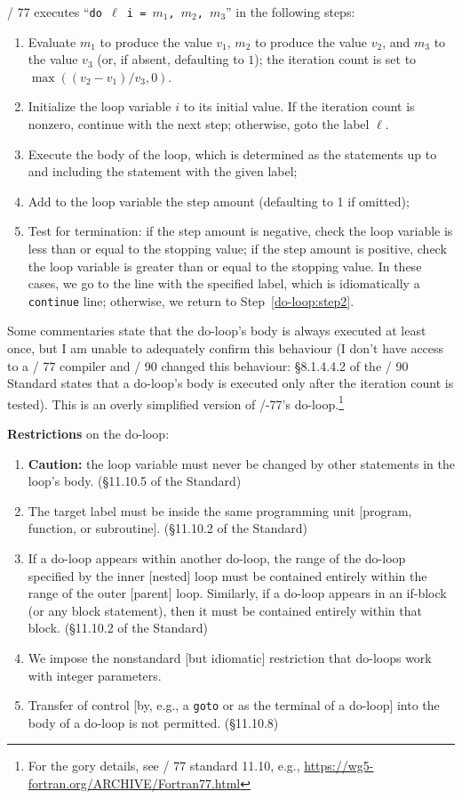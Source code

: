 \FORTRAN/ 77 executes ``\texttt{do $\ell$ i = $m_{1}$, $m_{2}$, $m_{3}$}''
in the following steps:
\begin{enumerate}
\item Evaluate $m_{1}$ to produce the value $v_{1}$, $m_{2}$ to produce
  the value $v_{2}$, and $m_{3}$ to the value $v_{3}$ (or, if absent,
  defaulting to $1$); the iteration
  count is set to $\max((v_{2}-v_{1})/v_{3}, 0)$.
\item Initialize the loop variable $i$ to its initial value. If the
  iteration count is nonzero, continue with the next step; otherwise,
  goto the label $\ell$.
\item\label{do-loop:step2} Execute the body of the loop, which is
  determined as the statements up to and including the statement with
  the given label;
\item Add to the loop variable the step amount (defaulting to 1 if omitted);
\item Test for termination: if the step amount is negative, check the
  loop variable is less than or equal to the stopping value; if the step
  amount is positive, check the loop variable is greater than or equal
  to the stopping value. In these cases, we go to the line with the
  specified label, which is idiomatically a \texttt{continue} line;
  otherwise, we return to Step~\ref{do-loop:step2}.
\end{enumerate}
Some commentaries state that the do-loop's body is always executed at least
once, but I am unable to adequately confirm this behaviour (I don't have
access to a \FORTRAN/ 77 compiler and \FORTRAN/ 90 changed this
behaviour: \S8.1.4.4.2 of the \FORTRAN/
90 Standard states that a do-loop's body is executed only after the
iteration count is tested).
This is an overly simplified version of \FORTRAN/-77's
do-loop.\footnote{For the gory details, see \FORTRAN/ 77 standard 11.10,
e.g., \url{https://wg5-fortran.org/ARCHIVE/Fortran77.html}}

\textbf{Restrictions} on the do-loop:
\begin{enumerate}
\item \textbf{Caution:} the loop variable must never be changed by other
statements in the loop's body. (\S11.10.5 of the Standard)
\item The target label must be inside the same programming unit
  [program, function, or subroutine]. (\S11.10.2 of the Standard)
\item If a do-loop appears within another do-loop, the range of the
  do-loop specified by the inner [nested] loop must be contained
  entirely within the range of the outer [parent] loop. Similarly, if a
  do-loop appears in an if-block (or any block statement), then it must
  be contained entirely within that block. (\S11.10.2 of the Standard)
\item We impose the nonstandard [but idiomatic] restriction that
  do-loops work with integer parameters.
\item Transfer of control [by, e.g., a \texttt{goto} or as the terminal
  of a do-loop] into the body of a do-loop is not permitted. (\S11.10.8)
\end{enumerate}

